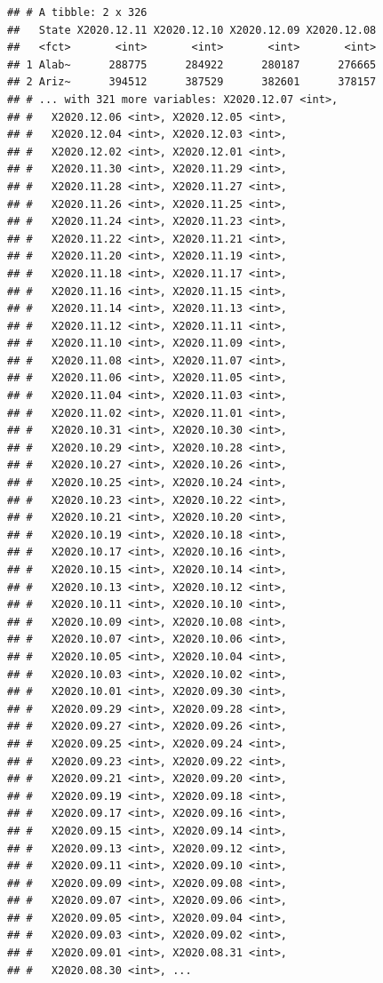 \documentclass[]{book}
\begin{document}
\begin{verbatim}
## # A tibble: 2 x 326
##   State X2020.12.11 X2020.12.10 X2020.12.09 X2020.12.08
##   <fct>       <int>       <int>       <int>       <int>
## 1 Alab~      288775      284922      280187      276665
## 2 Ariz~      394512      387529      382601      378157
## # ... with 321 more variables: X2020.12.07 <int>,
## #   X2020.12.06 <int>, X2020.12.05 <int>,
## #   X2020.12.04 <int>, X2020.12.03 <int>,
## #   X2020.12.02 <int>, X2020.12.01 <int>,
## #   X2020.11.30 <int>, X2020.11.29 <int>,
## #   X2020.11.28 <int>, X2020.11.27 <int>,
## #   X2020.11.26 <int>, X2020.11.25 <int>,
## #   X2020.11.24 <int>, X2020.11.23 <int>,
## #   X2020.11.22 <int>, X2020.11.21 <int>,
## #   X2020.11.20 <int>, X2020.11.19 <int>,
## #   X2020.11.18 <int>, X2020.11.17 <int>,
## #   X2020.11.16 <int>, X2020.11.15 <int>,
## #   X2020.11.14 <int>, X2020.11.13 <int>,
## #   X2020.11.12 <int>, X2020.11.11 <int>,
## #   X2020.11.10 <int>, X2020.11.09 <int>,
## #   X2020.11.08 <int>, X2020.11.07 <int>,
## #   X2020.11.06 <int>, X2020.11.05 <int>,
## #   X2020.11.04 <int>, X2020.11.03 <int>,
## #   X2020.11.02 <int>, X2020.11.01 <int>,
## #   X2020.10.31 <int>, X2020.10.30 <int>,
## #   X2020.10.29 <int>, X2020.10.28 <int>,
## #   X2020.10.27 <int>, X2020.10.26 <int>,
## #   X2020.10.25 <int>, X2020.10.24 <int>,
## #   X2020.10.23 <int>, X2020.10.22 <int>,
## #   X2020.10.21 <int>, X2020.10.20 <int>,
## #   X2020.10.19 <int>, X2020.10.18 <int>,
## #   X2020.10.17 <int>, X2020.10.16 <int>,
## #   X2020.10.15 <int>, X2020.10.14 <int>,
## #   X2020.10.13 <int>, X2020.10.12 <int>,
## #   X2020.10.11 <int>, X2020.10.10 <int>,
## #   X2020.10.09 <int>, X2020.10.08 <int>,
## #   X2020.10.07 <int>, X2020.10.06 <int>,
## #   X2020.10.05 <int>, X2020.10.04 <int>,
## #   X2020.10.03 <int>, X2020.10.02 <int>,
## #   X2020.10.01 <int>, X2020.09.30 <int>,
## #   X2020.09.29 <int>, X2020.09.28 <int>,
## #   X2020.09.27 <int>, X2020.09.26 <int>,
## #   X2020.09.25 <int>, X2020.09.24 <int>,
## #   X2020.09.23 <int>, X2020.09.22 <int>,
## #   X2020.09.21 <int>, X2020.09.20 <int>,
## #   X2020.09.19 <int>, X2020.09.18 <int>,
## #   X2020.09.17 <int>, X2020.09.16 <int>,
## #   X2020.09.15 <int>, X2020.09.14 <int>,
## #   X2020.09.13 <int>, X2020.09.12 <int>,
## #   X2020.09.11 <int>, X2020.09.10 <int>,
## #   X2020.09.09 <int>, X2020.09.08 <int>,
## #   X2020.09.07 <int>, X2020.09.06 <int>,
## #   X2020.09.05 <int>, X2020.09.04 <int>,
## #   X2020.09.03 <int>, X2020.09.02 <int>,
## #   X2020.09.01 <int>, X2020.08.31 <int>,
## #   X2020.08.30 <int>, ...
\end{verbatim}
\end{document}
